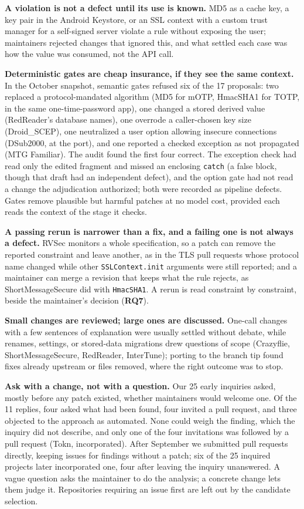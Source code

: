 \documentclass[conference]{IEEEtran}
\newcommand{\researchq}[1]{\textbf{RQ#1}}
\begin{document}
\textbf{A violation is not a defect until its use is known.} MD5 as a cache
key, a key pair in the Android Keystore, or an SSL context with a custom trust
manager for a self-signed server violate a rule without exposing the user;
maintainers rejected changes that ignored this, and what settled each case was
how the value was consumed, not the API call.

\textbf{Deterministic gates are cheap insurance, if they see the same context.}
In the October snapshot, semantic gates refused six of the 17 proposals: two
replaced a protocol-mandated algorithm (MD5 for mOTP, HmacSHA1 for TOTP, in the
same one-time-password app), one changed a stored derived value (RedReader's
database names), one overrode a caller-chosen key size (Droid\_SCEP), one
neutralized a user option allowing insecure connections (DSub2000, at the
port), and one reported a checked exception as not propagated (MTG Familiar).
The audit found the first four correct. The exception check had read only the
edited fragment and missed an enclosing \texttt{catch} (a false block, though
that draft had an independent defect), and the option gate had not read a
change the adjudication authorized; both were recorded as pipeline defects.
Gates remove plausible but harmful patches at no model cost, provided each
reads the context of the stage it checks.

\textbf{A passing rerun is narrower than a fix, and a failing one is not always
a defect.} RVSec monitors a whole specification, so a patch can remove the
reported constraint and leave another, as in the TLS pull requests whose
protocol name changed while other \texttt{SSLContext.init} arguments were still
reported; and a maintainer can merge a revision that keeps what the rule
rejects, as ShortMessageSecure did with \texttt{HmacSHA1}. A rerun is read
constraint by constraint, beside the maintainer's decision (\researchq{7}).

\textbf{Small changes are reviewed; large ones are discussed.} One-call
changes with a few sentences of explanation were usually settled without
debate, while renames, settings, or stored-data migrations drew questions of
scope (Crazyflie, ShortMessageSecure, RedReader, InterTune); porting to the
branch tip found fixes already upstream or files removed, where the right
outcome was to stop.

\textbf{Ask with a change, not with a question.} Our 25 early inquiries asked,
mostly before any patch existed, whether maintainers would welcome one. Of the
11 replies, four asked what had been found, four invited a pull request, and
three objected to the approach as automated. None could weigh the finding,
which the inquiry did not describe, and only one of the four invitations was
followed by a pull request (Tokn, incorporated). After September we submitted pull
requests directly, keeping issues for findings without a patch; six of the 25
inquired projects later incorporated one, four after leaving the inquiry
unanswered. A vague question asks the maintainer to do the analysis; a
concrete change lets them judge it. Repositories requiring an issue first are
left out by the candidate selection.
\end{document}
